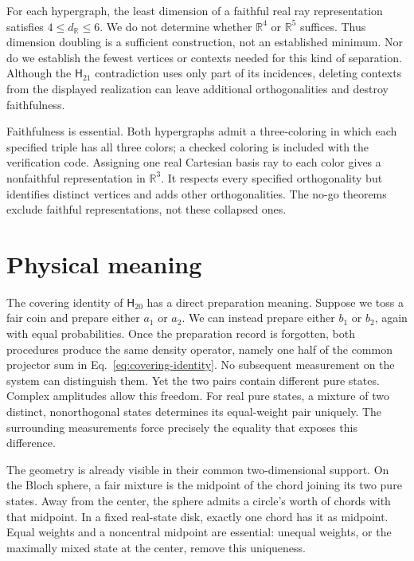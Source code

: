 \documentclass[12pt,a4paper]{article}
\theoremstyle{definition}
\theoremstyle{remark}
\newcommand{\R}{\mathbb R}
\newcommand{\Htwenty}{\mathsf H_{20}}
\newcommand{\Htwentyone}{\mathsf H_{21}}
\begin{document}
For each hypergraph, the least dimension of a faithful real ray
representation satisfies $4\le d_{\R}\le6$.  We do not determine whether
$\R^4$ or $\R^5$ suffices.  Thus dimension doubling is a sufficient
construction, not an established minimum.  Nor do we establish the fewest
vertices or contexts needed for this kind of separation.  Although the
$\Htwentyone$ contradiction uses only part of its incidences, deleting
contexts from the displayed realization can leave additional
orthogonalities and destroy faithfulness.

Faithfulness is essential.  Both hypergraphs admit a three-coloring
in which each specified triple has all three colors; a checked coloring
is included with the verification code.  Assigning one real Cartesian
basis ray to each color gives a nonfaithful representation in $\R^3$.
It respects every specified orthogonality but identifies distinct vertices
and adds other orthogonalities.  The no-go theorems exclude faithful
representations, not these collapsed ones.

\section{Physical meaning}
\label{sec:physical}

The covering identity of $\Htwenty$ has a direct preparation meaning.
Suppose we toss a fair coin and prepare either $a_1$ or $a_2$.  We can
instead prepare either $b_1$ or $b_2$, again with equal probabilities.
Once the preparation record is forgotten, both procedures produce the
same density operator, namely one half of the common projector sum in
Eq.~\eqref{eq:covering-identity}.  No subsequent measurement on the system
can distinguish them.  Yet the two pairs contain different pure states.
Complex amplitudes allow this freedom.  For real pure states, a mixture
of two distinct, nonorthogonal states determines its equal-weight pair
uniquely.  The surrounding measurements force precisely the equality
that exposes this difference.

The geometry is already visible in their common two-dimensional support.
On the Bloch sphere, a fair mixture is the midpoint of the chord joining
its two pure states.  Away from the center, the sphere admits a circle's
worth of chords with that midpoint.  In a fixed real-state disk, exactly
one chord has it as midpoint.  Equal weights and a noncentral midpoint
are essential: unequal weights, or the maximally mixed state at the
center, remove this uniqueness.
\end{document}
